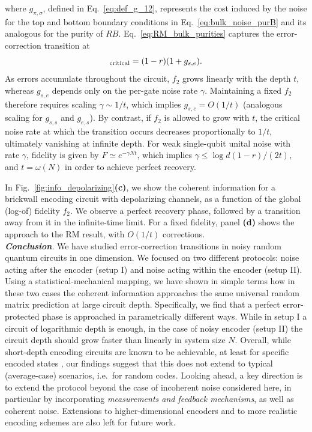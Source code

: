 \documentclass[aps,prl,twocolumn,superscriptaddress,numerical]{revtex4-2}
\newcommand{\fidel}{f_2} %
\newcommand{\idp}{e} %
\newcommand{\swp}{s} %
\renewcommand{\section}[1]{\textbf{\emph{#1}}.\!}
\begin{document}
where $g_{\pi,\sigma}$, defined in Eq.~\eqref{eq:def_g_12}, represents the cost induced by the noise for the top and bottom boundary conditions in Eq.~\eqref{eq:bulk_noise_purB} and its analogous for the purity of $RB$. Eq.~\eqref{eq:RM_bulk_purities} captures the error-correction transition at 
\begin{equation}
   [ \fidel]_{\rm critical}=(1-r)(1 + g_{\swp,\idp}).
\end{equation}
As errors accumulate throughout the circuit, $f_2$ grows linearly with the depth $t$, whereas $g_{\swp,\idp}$ depends only on the per-gate noise rate $\gamma$. Maintaining a fixed $\fidel$ therefore requires scaling $\gamma \sim 1/t$, which implies $g_{\swp,\idp} = O(1/t)$ (analogous scaling for $g_{\swp,\swp}$ and $g_{e,s}$). By contrast, if $f_2$ is allowed to grow with 
$t$, the critical noise rate at which the transition occurs decreases proportionally to 
$1/t$, ultimately vanishing at infinite depth. For weak single-qubit unital noise with rate $\gamma$, fidelity is given by $F \simeq e^{- \gamma N t}$, which implies $\gamma \leq  \log d (1-r)/(2 t)$, and $t=\omega(N)$ in order to achieve perfect recovery. 

In Fig.~\ref{fig:info_depolarizing}\textbf{(c)}, we show the coherent information for a brickwall encoding circuit with depolarizing channels, as a function of the global (log-of) fidelity $\fidel$. We observe a perfect recovery phase, followed by a transition away from it in the infinite-time limit. For a fixed fidelity, panel \textbf{(d)} shows the approach to the RM result, with $O(1/t)$ corrections.\\

\section{Conclusion}
We have studied error-correction transitions in noisy random quantum circuits in one dimension. We focused on two different protocols: noise acting after the encoder (setup I) and noise acting within the encoder (setup II). Using a statistical-mechanical mapping, we have shown in simple terms how in these two cases the coherent information approaches the same universal random matrix prediction at large circuit depth. Specifically, we find that a perfect error-protected phase is approached in parametrically different ways. While in setup I a circuit of logarithmic depth is enough, in the case of noisy encoder (setup II) the circuit depth should grow faster than linearly in system size $N$. 
Overall, while short-depth encoding circuits are known to be achievable, at least for specific encoded states \cite{tan2025singleshotuniversalityquantumldpc, Hillmann_2025, nguyen2025quantumfaulttoleranceconstantspace}, our findings suggest that this does not extend to typical (average-case) scenarios, i.e.\ for random codes.
Looking ahead, a key direction is to extend the protocol beyond the case of incoherent noise considered here, in particular by incorporating \emph{measurements and feedback mechanisms}, as well as coherent noise. Extensions to higher-dimensional encoders and to more realistic encoding schemes are also left for future work.
\end{document}
